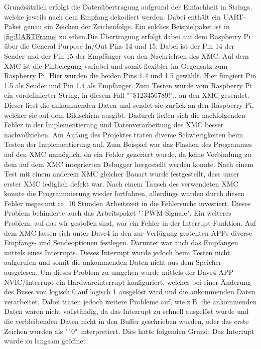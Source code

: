 \documentclass[12pt,a4paper,bibliography=totoc,listof=totoc]{scrartcl}
\begin{document}
Grundsätzlich erfolgt die Datenübertragung aufgrund der Einfachheit in Strings, welche jeweils nach dem 
Empfang dekodiert werden. Dabei enthält ein UART-Paket genau ein Zeichen der Zeichenfolge. Ein solches 
Beispielpaket ist in \ref{fig:UARTFrame} zu sehen.Die Übertragung erfolgt dabei auf dem Raspberry Pi über 
die General Purpose In/Out Pins 14 und 15. Dabei ist der Pin 14 der Sender und der Pin 15 der Empfänger 
von den Nachrichten des XMC. Auf dem XMC ist die Pinbelegung variabel und somit flexibler im Gegensatz 
zum Raspberry Pi. Hier wurden die beiden Pins 1.4 und 1.5 gewählt. Hier fungiert Pin 1.5 als Sender und 
Pin 1.4 als Empfänger. Zum Testen wurde vom Raspberry Pi ein vordefinierter String, in diesem Fall 
"`\$123456789!",, an den XMC gesendet. Dieser liest die ankommenden Daten und sendet sie zurück an den 
Raspberry Pi, welcher sie auf dem Bildschirm ausgibt. Dadurch ließen sich die nachfolgenden Fehler in 
der Implementierung und Datenverarbeitung des XMC besser nachvollziehen. Am Anfang des Projektes traten diverse Schwierigkeiten 
beim Testen der Implementierung auf. Zum Beispiel war das Flashen des Programmes auf den XMC unmöglich, 
da ein Fehler generiert wurde, da keine Verbindung zu dem auf dem XMC integrierten Debugger hergestellt 
werden konnte. Nach einem Test mit einem anderem XMC gleicher Bauart wurde festgestellt, dass unser erster 
XMC lediglich defekt war. Nach einem Tausch des verwendeten XMC konnte die Programmierung wieder 
fortfahren, allerdings wurden durch diesen Fehler insgesamt ca. 10 Stunden Arbeitszeit in die Fehlersuche 
investiert. Dieses Problem behinderte auch das Arbeitspaket "`PWM-Signale".
Ein weiteres Problem, auf das wir gestoßen sind, war ein Fehler in der Interrupt-Funktion. Auf dem XMC 
lassen sich unter Dave4 in den zur Verfügung gestellten APPs diverse Empfangs- und Sendeoptionen festlegen. 
Darunter war auch das Empfangen mittels eines Interrupts. Dieses Interrupt wurde jedoch beim Testen nicht 
aufgerufen und somit die ankommenden Daten nicht aus dem Speicher ausgelesen. Um dieses Problem zu umgehen 
wurde mittels der Dave4-APP NVIC/Interrupt ein Hardwareinterrupt konfiguriert, welches bei einer Änderung 
des Buses von logisch 0 auf logisch 1 ausgelöst wird und die ankommenden Daten verarbeitet. Dabei traten 
jedoch weitere Probleme auf, wie z.B. die ankommenden Daten waren nicht vollständig, da das Interrupt zu 
schnell ausgelöst wurde und die verbleibenden Daten nicht in den Buffer geschrieben wurden, oder das erste 
Zeichen wurden als "`0" \,interpretiert. Dies hatte folgenden Grund: Das Interrupt wurde zu langsam geöffnet 
\end{document}
